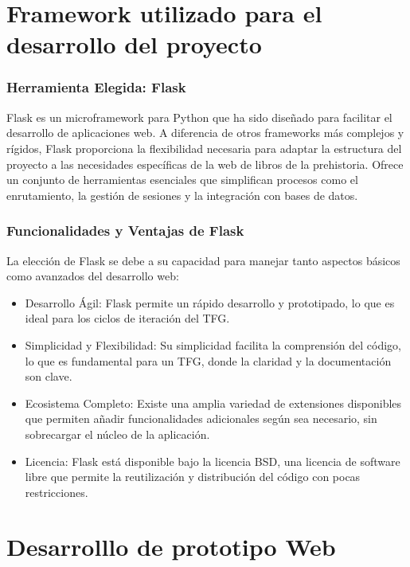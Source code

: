 

\section{Framework utilizado para el desarrollo del proyecto}

\subsubsection{Herramienta Elegida: Flask}

Flask es un microframework para Python que ha sido diseñado para facilitar el desarrollo de aplicaciones web. A diferencia de otros frameworks más complejos y rígidos, Flask proporciona la flexibilidad necesaria para adaptar la estructura del proyecto a las necesidades específicas de la web de libros de la prehistoria. Ofrece un conjunto de herramientas esenciales que simplifican procesos como el enrutamiento, la gestión de sesiones y la integración con bases de datos.

\subsubsection{Funcionalidades y Ventajas de Flask}

La elección de Flask se debe a su capacidad para manejar tanto aspectos básicos como avanzados del desarrollo web:

\begin{itemize}
    \item Desarrollo Ágil: Flask permite un rápido desarrollo y prototipado, lo que es ideal para los ciclos de iteración del TFG.
    \item Simplicidad y Flexibilidad: Su simplicidad  facilita la comprensión del código, lo que es fundamental para un TFG, donde la claridad y la documentación son clave.
    \item Ecosistema Completo: Existe una amplia variedad de extensiones disponibles que permiten añadir funcionalidades adicionales según sea necesario, sin sobrecargar el núcleo de la aplicación.
    \item Licencia: Flask está disponible bajo la licencia BSD, una licencia de software libre que permite la reutilización y distribución del código con pocas restricciones.
\end{itemize}
 


\section{Desarrolllo de prototipo Web}

